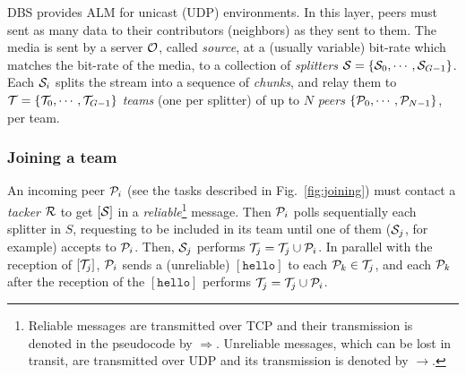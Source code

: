 DBS provides ALM for unicast (UDP) environments. {\color{red} In this
  layer, peers must sent as many data to their contributors
  (neighbors) as they sent to them.} The media is sent by a server
${\cal O}$, called \emph{source}, at a (usually variable) bit-rate
which matches the bit-rate of the media, to a collection of
\emph{splitters} ${\cal S}=\{{\cal S}_0, \cdots, {\cal
  S}_{G-1}\}$. Each ${\cal S}_i$ splits the stream into a sequence of
\emph{chunks}, and relay them to ${\cal T}=\{{\cal T}_0,\cdots,{\cal
  T}_{G-1}\}$ \emph{teams} (one per splitter) of up to $N$
\emph{peers} $\{{\cal P}_0,\cdots,{\cal P}_{N-1}\}$, per team.

\subsubsection{Joining a team}
\label{dbs:joining}
\begin{figure*}
  \caption{Peer joining.\label{fig:joining}}
\end{figure*}
An incoming peer ${\cal P}_i$ (see the tasks described in
Fig.~\ref{fig:joining}) must contact a \emph{tacker} ${\cal R}$ to get
$[{\cal S}]$ in a \emph{reliable}\footnote{Reliable messages are
  transmitted over TCP and their transmission is denoted in the
  pseudocode by $\Rightarrow$. Unreliable messages, which can be lost
  in transit, are transmitted over UDP and its transmission is denoted
  by $\rightarrow$.} message. Then ${\cal P}_i$ polls sequentially
each splitter in $S$, requesting to be included in its team until one
of them (${\cal S}_j$, for example) accepts to ${\cal P}_i$. Then,
${\cal S}_j$ performs ${\cal T}_j = {\cal T}_j \cup {\cal P}_i$. In
parallel with the reception of $[{\cal T}_j]$, ${\cal P}_i$ sends a
(unreliable) $[\mathtt{hello}]$ to each ${\cal P}_k\in {\cal T}_j$,
and each ${\cal P}_k$ after the reception of the $[\mathtt{hello}]$
performs ${\cal T}_j = {\cal T}_j \cup {\cal P}_i$.
